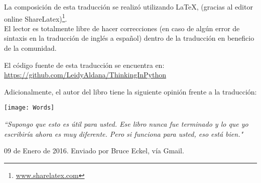 \newpage
\thispagestyle{empty}


La composición de esta traducción se realizó utilizando \LaTeX, (gracias al editor online ShareLatex)\footnote{\url{www.sharelatex.com}}. \\

El lector es totalmente libre de hacer correcciones (en caso de algún error de sintaxis en la traducción de inglés a español) dentro de la traducción en beneficio de la comunidad. \\

\begin{center}

El código fuente de esta traducción se encuentra en: \\
\url{https://github.com/LeidyAldana/ThinkingInPython}  

\end{center}

\vspace{0.6cm}


Adicionalmente, el autor del libro tiene la siguiente opinión frente a la traducción:

\vspace{0.6cm}

\texttt{[image: Words]}

\vspace{0.6cm}

\textit{ “Supongo que esto es útil para usted. Ese libro nunca fue terminado y lo que yo escribiría ahora es muy diferente. Pero si funciona para usted, eso está bien."  }   

\begin{flushright}

    09 de Enero de 2016. Enviado por Bruce Eckel, vía Gmail.
    
\end{flushright}


\newpage

